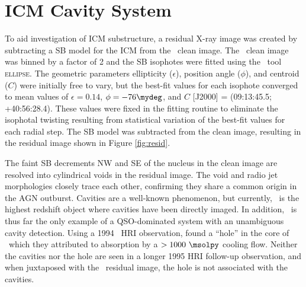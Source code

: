 \documentclass[useAMS,usenatbib]{mn2e}
\begin{document}
\section{ICM Cavity System}
\label{sec:cavs}

To aid investigation of ICM substructure, a residual X-ray image was
created by subtracting a SB model for the ICM from the \chandra\ clean
image. The \chandra\ clean image was binned by a factor of 2 and the
SB isophotes were fitted using the \iraf\ tool \textsc{ellipse}. The
geometric parameters ellipticity ($\epsilon$), position angle
($\phi$), and centroid ($C$) were initially free to vary, but the
best-fit values for each isophote converged to mean values of
$\epsilon = 0.14$, $\phi = -76\mydeg$, and $C$ [J2000] = (09:13:45.5;
+40:56:28.4). These values were fixed in the fitting routine to
eliminate the isophotal twisting resulting from statistical variation
of the best-fit values for each radial step. The SB model was
subtracted from the clean image, resulting in the residual image shown
in Figure \ref{fig:resid}.

The faint SB decrements NW and SE of the nucleus in the clean image
are resolved into cylindrical voids in the residual image. The void
and radio jet morphologies closely trace each other, confirming they
share a common origin in the AGN outburst. Cavities are a well-known
phenomenon, but currently, \irs\ is the highest redshift object where
cavities have been directly imaged. In addition, \irs\ is thus far the
only example of a QSO-dominated system with an unambiguous cavity
detection. Using a 1994 \rosat\ HRI observation,
\citet{1995MNRAS.274L..63F} found a ``hole'' in the core of
\rxj\ which they attributed to absorption by a $> 1000 ~\msolpy$
cooling flow. Neither the cavities nor the hole are seen in a longer
1995 HRI follow-up observation, and when juxtaposed with the
\chandra\ residual image, the hole is not associated with the
cavities.
\end{document}

